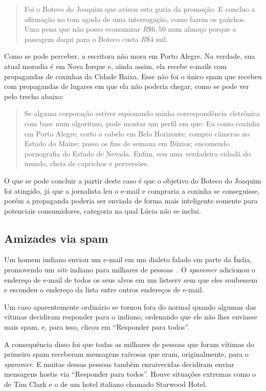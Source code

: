 \documentclass[a4paper,dvipdfm]{article}
\begin{document}
		\begin{quotation}
			Foi o Boteco do Joaquim que avisou esta guria da promoção. E concluo a afirmação no tom agudo de uma interrogação, como fazem os gaúchos. Uma pena que não posso economizar $R\$ 6,50$ num almoço porque a passagem daqui para o Boteco custa $R\$ 4$ mil.
		\end{quotation}

		Como se pode perceber, a escritora não mora em Porto Alegre.
		Na verdade, sua atual moradia é em Nova Iorque e, ainda assim, ela recebe e-mails com propagandas de coxinhas da Cidade Baixa.
		Esse não foi o único spam que recebeu com propagandas de lugares em que ela não poderia chegar, como se pode ver pelo trecho abaixo:

		\begin{quotation}
			Se alguma corporação estiver espionando minha correspondência eletrônica com base num algoritmo, pode montar um perfil em que: 
			Eu como coxinha em Porto Alegre; 
			corto o cabelo em Belo Horizonte; 
			compro câmeras no Estado do Maine; 
			passo os fins de semana em Búzios; 
			encomendo pornografia do Estado de Nevada. 
			Enfim, sou uma verdadeira cidadã do mundo, cheia de caprichos e perversões.
		\end{quotation}
			
		O que se pode concluir a partir deste caso é que o objetivo do Boteco do Joaquim foi atingido, já que a jornalista leu o e-mail e compraria a coxinha se conseguisse, porém a propaganda poderia ser enviada de forma mais inteligente somente para potenciais consumidores, categoria na qual Lúcia não se inclui.

	\subsection {Amizades via spam}
		Um homem indiano enviou um e-mail em um dialeto falado em parte da Índia, promovendo um \emph{site} indiano para milhares de pessoas~\cite{cr:ubs}.
		O \emph{spammer} adicionou o endereço de e-mail de todos os seus alvos em um \gls{listserv} sem que eles soubessem e escondeu o endereço da lista entre outros endereços de e-mail.
		
		Um caso aparentemente ordinário se tornou fora do normal quando algumas das vítimas decidiram responder para o indiano, ordenando que ele não lhes enviasse mais spam, e, para isso, clicou em ``Responder para todos''.
		
		A consequência disso foi que todas as milhares de pessoas que foram vítimas do primeiro spam receberam mensagens raivosas que eram, originalmente, para o \emph{spammer}.
		E muitas dessas pessoas também enraivecidas decidiram enviar mensagens hostis via ``Responder para todos''.
		Houve situações extremas como o de Tim Clark e o de um hotel italiano chamado Starwood Hotel.
		
\end{document}
